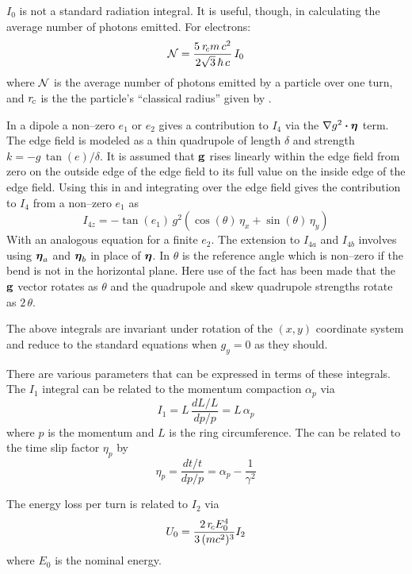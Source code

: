 $I_0$ is not a standard radiation integral. It is useful, though, in calculating the average number
of photons emitted. For electrons:
  \begin{equation}
    {\cal N} = \frac{5 \: r_{\!c} m \, c^2}{2 \sqrt{3} \, \hbar \, c} \, I_0 
  \end{equation}
where $\cal N$ is the average number of photons emitted by a particle over one turn, and $r_{\!c}$ is
the the particle's ``classical radius'' given by .

In a dipole a non--zero $e_1$ or $e_2$ gives a contribution to $I_4$ via the $\nabla g^2 \mathbin{\boldsymbol{\cdot}}
\boldsymbol{\eta}$ term. The edge field is modeled as a thin quadrupole of length $\delta$ and strength $k = -g
\, \tan(e) / \delta$. It is assumed that ${\bf g}$ rises linearly within the edge field from zero on
the outside edge of the edge field to its full value on the inside edge of the edge field. Using
this in  and integrating over the edge field gives the contribution to $I_4$ from a
non--zero $e_1$ as
  \begin{equation}
    I_{4z} = -\tan(e_1) \, g^2
    \left( \cos(\theta) \, \eta_x + \sin(\theta) \, \eta_y \right)
    \label{iegct}
  \end{equation}
With an analogous equation for a finite $e_2$. The extension to $I_{4a}$ and $I_{4b}$ involves using
$\boldsymbol{\eta}_a$ and $\boldsymbol{\eta}_b$ in place of $\boldsymbol{\eta}$.  In  $\theta$ is the reference
 angle which is non--zero if the bend is not in the horizontal plane. Here use of the fact
has been made that the ${\bf g}$ vector rotates as $\theta$ and the quadrupole and skew quadrupole
strengths rotate as $2\, \theta$.

The above integrals are invariant under rotation of the $(x,y)$ coordinate system and reduce to the
standard equations when $g_y = 0$ as they should.

There are various parameters that can be expressed in terms of these integrals. The $I_1$ integral
can be related to the momentum compaction $\alpha_p$ via
  \begin{equation}
    I_1 = L \, \frac{dL/L}{dp/p} = L \, \alpha_p
  \end{equation}
where $p$ is the momentum and $L$ is the ring circumference. The can be related to the time slip
factor $\eta_p$ by
\begin{equation}
  \eta_p = \frac{dt/t}{dp/p} = \alpha_p - \frac{1}{\gamma^2}
\end{equation}

The energy loss per turn is related to $I_2$ via
  \begin{equation}
    U_0 = \frac{2 \, r_{\!c} E_0^4}{3 \, (mc^2)^3} I_2
  \end{equation}
where $E_0$ is the nominal energy.

